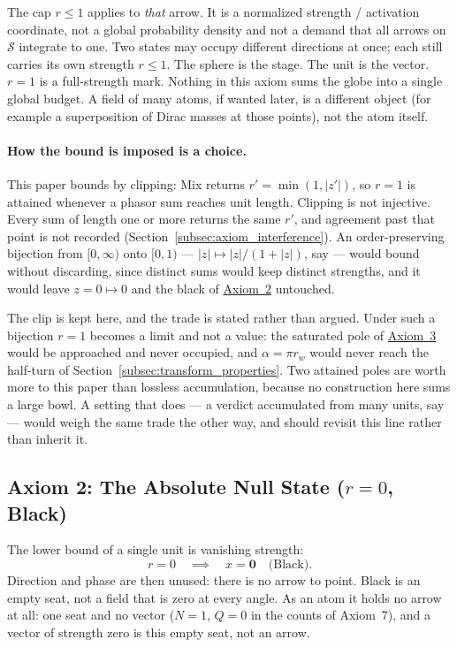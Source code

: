 \documentclass[12pt, a4paper]{article}
\begin{document}
The cap $r \le 1$ applies to \emph{that} arrow. It is a normalized strength / activation coordinate, not a global probability density and not a demand that all arrows on $\mathcal{S}$ integrate to one. Two states may occupy
different directions at once; each still carries its own strength
$r\le 1$. The sphere is the stage. The unit is the vector.
$r=1$ is a full-strength mark. Nothing in this axiom sums the globe
into a single global budget. A field of many atoms, if wanted later, is a different object (for example a superposition of Dirac masses at those points), not the atom itself.

\paragraph{How the bound is imposed is a choice.}
This paper bounds by clipping: Mix returns $r'=\min(1,|z'|)$, so
$r=1$ is attained whenever a phasor sum reaches unit length. Clipping
is not injective. Every sum of length one or more returns the same
$r'$, and agreement past that point is not recorded
(Section~\ref{subsec:axiom_interference}). An order-preserving
bijection from $[0,\infty)$ onto $[0,1)$ --- $|z|\mapsto|z|/(1+|z|)$,
say --- would bound without discarding, since distinct sums would keep
distinct strengths, and it would leave $z=0\mapsto 0$ and the black of
\hyperref[subsec:axiom_null]{Axiom~2} untouched.

The clip is kept here, and the trade is stated rather than argued.
Under such a bijection $r=1$ becomes a limit and not a value: the
saturated pole of \hyperref[subsec:axiom_white]{Axiom~3} would be approached
and never occupied, and $\alpha=\pi r_w$ would never reach the
half-turn of Section~\ref{subsec:transform_properties}. Two attained
poles are worth more to this paper than lossless accumulation, because
no construction here sums a large bowl. A setting that does --- a
verdict accumulated from many units, say --- would weigh the same
trade the other way, and should revisit this line rather than inherit
it.

\subsection{Axiom 2: The Absolute Null State ($r = 0$, Black)}
\label{subsec:axiom_null}
The lower bound of a single unit is vanishing strength:
\begin{equation}
    r = 0 \quad \implies \quad x = \mathbf{0}
    \quad \text{(Black)}.
    \label{eq:null_state}
\end{equation}
Direction and phase are then unused: there is no arrow to point.
Black is an empty seat, not a field that is zero at every angle. As an
atom it holds no arrow at all: one seat and no vector ($N=1$, $Q=0$ in
the counts of Axiom~7), and a vector of strength zero is this empty
seat, not an arrow.
\end{document}
